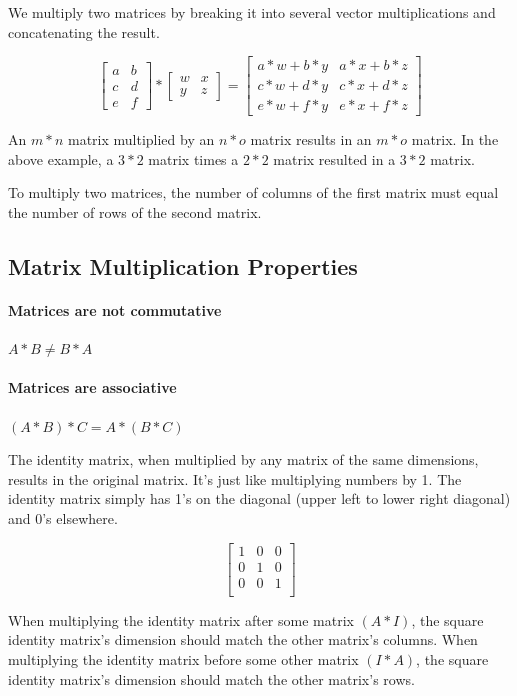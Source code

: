 \documentclass[UTF8]{article}
\begin{document}
We multiply two matrices by breaking it into several vector multiplications and concatenating the result.

\[ \begin{bmatrix} a&b\\c&d\\e&f \end{bmatrix} * \begin{bmatrix} w&x\\y&z \end{bmatrix} = \begin{bmatrix} a*w + b*y & a*x + b*z \\ c*w + d*y & c*x + d*z \\ e*w + f*y & e*x + f*z \end{bmatrix}\]

An $m * n$ matrix multiplied by an $n * o$ matrix results in an $m * o$ matrix. In the above example, a $3 * 2$ matrix times a $2 * 2$ matrix resulted in a $3 * 2$ matrix.

To multiply two matrices, the number of columns of the first matrix must equal the number of rows of the second matrix.

\subsection{Matrix Multiplication Properties}

\paragraph{Matrices are not commutative} $A*B\ne B*A$

\paragraph{Matrices are associative} $(A*B)*C=A*(B*C)$

The identity matrix, when multiplied by any matrix of the same dimensions, results in the original matrix. It's just like multiplying numbers by 1. The identity matrix simply has 1's on the diagonal (upper left to lower right diagonal) and 0's elsewhere.

\[ \begin{bmatrix} 1 & 0 & 0 \\ 0 & 1 & 0 \\ 0 & 0 & 1 \\ \end{bmatrix} \]

When multiplying the identity matrix after some matrix $(A*I)$, the square identity matrix's dimension should match the other matrix's columns. When multiplying the identity matrix before some other matrix $(I*A)$, the square identity matrix's dimension should match the other matrix's rows.
\end{document}
